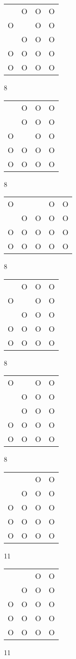 \begin{tabular}{|m{0.2cm}m{0.2cm}m{0.2cm}m{0.2cm}|}\hline
 &O&O&O\\
O& &O&O\\
 &O&O&O\\
O&O&O&O\\
O&O&O&O\\
\hline\end{tabular}8
\begin{tabular}{|m{0.2cm}m{0.2cm}m{0.2cm}m{0.2cm}|}\hline
 &O&O&O\\
 &O&O&O\\
O& &O&O\\
O&O&O&O\\
O&O&O&O\\
\hline\end{tabular}8
\begin{tabular}{|m{0.2cm}m{0.2cm}m{0.2cm}m{0.2cm}m{0.2cm}|}\hline
O& & &O&O\\
 &O&O&O&O\\
O&O&O&O&O\\
O&O&O&O&O\\
\hline\end{tabular}8
\begin{tabular}{|m{0.2cm}m{0.2cm}m{0.2cm}m{0.2cm}|}\hline
 &O&O&O\\
O& &O&O\\
 &O&O&O\\
O&O&O&O\\
O&O&O&O\\
\hline\end{tabular}8
\begin{tabular}{|m{0.2cm}m{0.2cm}m{0.2cm}m{0.2cm}|}\hline
O& &O&O\\
 &O&O&O\\
 &O&O&O\\
O&O&O&O\\
O&O&O&O\\
\hline\end{tabular}8
\begin{tabular}{|m{0.2cm}m{0.2cm}m{0.2cm}m{0.2cm}|}\hline
 & &O&O\\
 &O&O&O\\
O&O&O&O\\
O&O&O&O\\
O&O&O&O\\
\hline\end{tabular}11
\begin{tabular}{|m{0.2cm}m{0.2cm}m{0.2cm}m{0.2cm}|}\hline
 & &O&O\\
 &O&O&O\\
O&O&O&O\\
O&O&O&O\\
O&O&O&O\\
\hline\end{tabular}11

